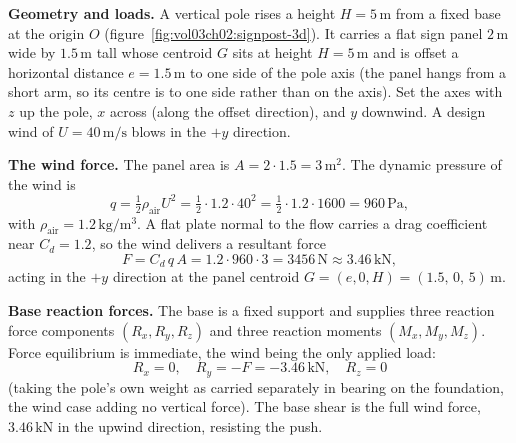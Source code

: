 \textbf{Geometry and loads.} A vertical pole rises a height
$H = 5\,\si{\meter}$ from a fixed base at the origin $O$
(figure~\ref{fig:vol03ch02:signpost-3d}). It carries a flat sign panel
$2\,\si{\meter}$ wide by $1.5\,\si{\meter}$ tall whose centroid $G$ sits at
height $H = 5\,\si{\meter}$ and is offset a horizontal distance
$e = 1.5\,\si{\meter}$ to one side of the pole axis (the panel hangs from a
short arm, so its centre is to one side rather than on the axis). Set the axes
with $z$ up the pole, $x$ across (along the offset direction), and $y$ downwind.
A design wind of $U = 40\,\si{\meter\per\second}$ blows in the $+y$ direction.



\textbf{The wind force.} The panel area is $A = 2 \cdot 1.5 = 3\,\si{\meter
\squared}$. The dynamic pressure of the wind is
\[
q = \tfrac12 \rho_{\text{air}} U^2
= \tfrac12 \cdot 1.2 \cdot 40^2 = \tfrac12 \cdot 1.2 \cdot 1600
= 960\,\text{Pa},
\]
with $\rho_{\text{air}} = 1.2\,\si{\kilogram\per\meter\cubed}$. A flat plate
normal to the flow carries a drag coefficient near $C_d = 1.2$, so the wind
delivers a resultant force
\[
F = C_d\, q\, A = 1.2 \cdot 960 \cdot 3 = 3456\,\text{N} \approx 3.46\,\text{kN},
\]
acting in the $+y$ direction at the panel centroid $G = (e, 0, H) =
(1.5,\,0,\,5)\,\si{\meter}$.

\textbf{Base reaction forces.} The base is a fixed support and supplies three
reaction force components $(R_x, R_y, R_z)$ and three reaction moments
$(M_x, M_y, M_z)$. Force equilibrium is immediate, the wind being the only
applied load:
\[
R_x = 0, \quad R_y = -F = -3.46\,\text{kN}, \quad R_z = 0
\]
(taking the pole's own weight as carried separately in bearing on the
foundation, the wind case adding no vertical force). The base shear is the full
wind force, $3.46\,\text{kN}$ in the upwind direction, resisting the push.

